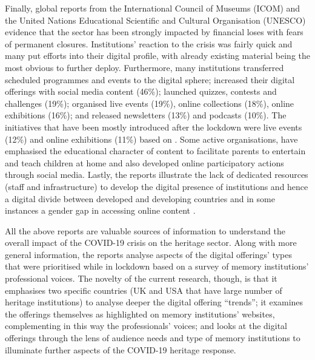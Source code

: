 \documentclass{egpubl}
\begin{document}
Finally, global reports from the International Council of Museums (ICOM) and the United Nations Educational Scientific and Cultural Organisation (UNESCO) evidence that the sector has been strongly impacted by financial loses with fears of permanent closures. Institutions' reaction to the crisis was fairly quick and many put efforts into their digital profile, with already existing material being the most obvious to further deploy. Furthermore, many institutions transferred scheduled programmes and events to the digital sphere; increased their digital offerings with social media content (46\%); launched quizzes, contests and challenges (19\%); organised live events (19\%), online collections (18\%), online exhibitions (16\%); and released newsletters (13\%) and podcasts (10\%). The initiatives that have  been mostly introduced after the lockdown were live events  (12\%) and online exhibitions (11\%)  based on \cite{InternationalCouncilofMuseums2020b}. Some active organisations, have emphasised the educational character of content to facilitate parents to entertain and teach children at home and also developed online participatory actions through social media. Lastly, the reports illustrate the lack of dedicated resources (staff and infrastructure) to develop the digital presence of institutions and hence a digital divide between developed and developing countries and in some instances a gender gap in accessing online content \cite{UNESCO2020,InternationalCouncilofMuseums2020b}.

All the above reports are valuable sources of information to understand the overall impact of the COVID-19 crisis on the heritage sector. Along with more general information, the reports analyse aspects of the digital offerings' types that were prioritised while in lockdown based on a survey  of memory institutions' professional voices. The novelty of the current research, though, is that it emphasises two specific countries (UK and USA that have large number of heritage institutions) to analyse deeper the digital offering ``trends''; it examines the offerings themselves as highlighted on memory institutions' websites, complementing in this way the professionals' voices; and looks at the digital offerings through the lens of audience needs and type of memory institutions to illuminate further aspects of the COVID-19 heritage response.

\end{document}
